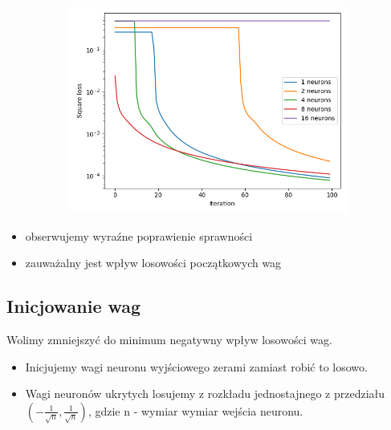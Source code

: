 \documentclass[12pt,a4paper]{article}
\begin{document}
\begin{figure}[h]
\medskip
\begin{subfigure}{0.5\textwidth}
  \includegraphics[width=\linewidth]{charts/no_output_activation/noactiv100iter_lr01_randw3.png}
  \caption{}
  \label{}
\end{subfigure}

\end{figure}

\begin{itemize}
  \item   obserwujemy wyraźne poprawienie sprawności
  \item   zauważalny jest wpływ losowości początkowych wag
\end{itemize}

\pagebreak

\subsection{Inicjowanie wag}

Wolimy zmniejszyć do minimum negatywny wpływ losowości wag.

\begin{itemize}
  \item   Inicjujemy wagi neuronu wyjściowego zerami zamiast robić to losowo.
  \item   Wagi neuronów ukrytych losujemy z rozkładu jednostajnego z przedziału \((-\frac{1}{\sqrt{n}}, \frac{1}{\sqrt{n}})\), gdzie n - wymiar wymiar wejścia neuronu.
\end{itemize}
\end{document}
